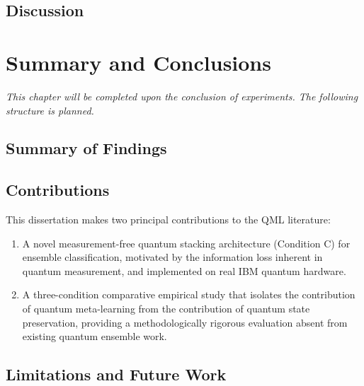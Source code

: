 \documentclass[]{UCD_CS_FYP_Report}
\begin{document}

\section{Discussion}


\chapter{Summary and Conclusions}

\textit{This chapter will be completed upon the conclusion of experiments. The following structure is planned.}

\section{Summary of Findings}


\section{Contributions}

This dissertation makes two principal contributions to the QML literature:

\begin{enumerate}
    \item A novel measurement-free quantum stacking architecture (Condition C) for ensemble classification, motivated by the information loss inherent in quantum measurement, and implemented on real IBM quantum hardware.
    \item A three-condition comparative empirical study that isolates the contribution of quantum meta-learning from the contribution of quantum state preservation, providing a methodologically rigorous evaluation absent from existing quantum ensemble work.
\end{enumerate}

\section{Limitations and Future Work}
\end{document}
